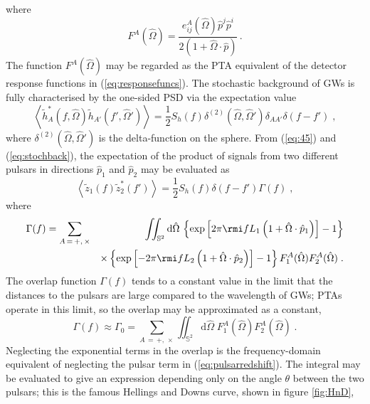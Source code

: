 where
\begin{equation}
F^{A}(\hat{\Omega}) = \frac{e_{ij}^{A}(\hat{\Omega})\hat{p}^{j}\hat{p}^{i}} {2\left(1+\hat{\Omega}\cdot\hat{p}\right)} \, .
\end{equation}
The function $F^{A}(\hat{\Omega})$ may be regarded as the PTA equivalent of the detector response functions in (\ref{eq:responsefuncs}). The stochastic background of GWs is fully characterised by the one-sided PSD via the expectation value
\begin{equation}\label{eq:stochback}
\left<\tilde{h}_{A}^{*}(f,\hat{\Omega})\tilde{h}_{A'}(f',\hat{\Omega}')\right> = \frac{1}{2}S_{h}(f)\delta^{(2)}(\hat{\Omega}, \hat{\Omega}')\delta_{AA'}\delta(f-f') \; ,
\end{equation}
where $\delta^{(2)}(\hat{\Omega},\hat{\Omega}')$ is the delta-function on the sphere. From (\ref{eq:45}) and (\ref{eq:stochback}), the expectation of the product of signals from two different pulsars in directions $\hat{p}_{1}$ and $\hat{p}_{2}$ may be evaluated as
\begin{equation} 
\left<\tilde{z}_{1}(f)\tilde{z}_{2}^{*}(f')\right> = \frac{1}{2}S_{h}(f)\delta (f-f')\Gamma(f) \; ,
\end{equation}
where
\begin{eqnarray}
\Gamma(f) &= \sum_{A\,=\,+,\,\times} & \iint_{{\mathbb{S}}^{2}}\mathrm{d}\hat{\Omega}\,\left\{\exp\left[2\pi\rmi fL_{1}\left(1+\hat{\Omega}\cdot\hat{p}_{1}\right)\right]-1\right\} \nonumber \\*
 & & \times \left\{\exp\left[-2\pi\rmi fL_{2}\left(1+\hat{\Omega}\cdot\hat{p}_{2}\right)\right]-1\right\} F_{1}^{A}(\hat{\Omega})F_{2}^{A}(\hat{\Omega}) \; .
\end{eqnarray}
The overlap function $\Gamma(f)$ tends to a constant value in the limit that the distances to the pulsars are large compared to the wavelength of GWs; PTAs operate in this limit, so the overlap may be approximated as a constant, 
\begin{equation}
\Gamma(f) \approx \Gamma_{0} = \sum_{A\,=\,+,\,\times}\iint_{{\mathbb{S}}^{2}}\mathrm{d}\hat{\Omega}\;F_{1}^{A}(\hat{\Omega})F_{2}^{A}(\hat{\Omega})\;.
\end{equation}
Neglecting the exponential terms in the overlap is the frequency-domain equivalent of neglecting the pulsar term in (\ref{eq:pulsarredshift}). The integral may be evaluated to give an expression depending only on the angle $\theta$ between the two pulsars; this is the famous Hellings and Downs curve, shown in figure \ref{fig:HnD},
